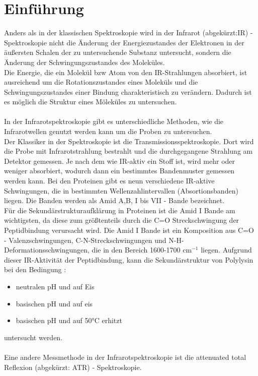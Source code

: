 \documentclass[10pt,a4paper]{article}
\begin{document}
	\section{Einführung}	
	Anders als in der klassischen Spektroskopie wird in der Infrarot (abgekürzt:IR) - Spektroskopie nicht die Änderung der Energiezustandes der Elektronen in der äußersten Schalen der zu untersuchende Substanz untersucht, sondern die Änderung der Schwingungszustandes des Moleküles.\\
	Die Energie, die ein Molekül bzw Atom von den IR-Strahlungen absorbiert, ist ausreichend um die Rotationszustandes eines Moleküls und die Schwingungszustandes einer Bindung charakteristisch zu verändern.
	Dadurch ist es möglich die Struktur eines Möleküles zu untersuchen.\\
	\\
	In der Infrarotspektroskopie gibt es unterschiedliche Methoden, wie die Infrarotwellen genutzt werden kann um die Proben zu untersuchen.\\
	Der Klassiker in der Spektroskopie ist die Transmissionsspektroskopie.
	Dort wird die Probe mit Infrarotstrahlung bestrahlt und die durchgegangene Strahlung am Detektor gemessen.
	Je nach dem wie IR-aktiv ein Stoff ist, wird mehr oder weniger absorbiert, wodurch dann ein bestimmtes Bandenmuster gemessen werden kann.
	Bei den Proteinen gibt es neun verschiedene IR-aktive Schwingungen, die in bestimmten Wellenzahlintervallen (Absortionsbanden) liegen. Die Banden werden als Amid A,B, I bis VII - Bande bezeichnet.\\
	Für die Sekundärstrukturaufklärung in Proteinen ist die Amid I Bande am wichtigsten, da diese zum größtenteils durch die C=O Streckschwingung der Peptidbindung verursacht wird. Die Amid I Bande ist ein Komposition aus C=O - Valenzschwingungen, C-N-Streckschwingungen und N-H-Deformationsschwingungen, die in den Bereich 1600-1700 cm$^{-1}$ liegen.
	Aufgrund dieser IR-Aktivität der Peptidbindung, kann die Sekundärstruktur von Polylysin bei den Bedingung :\\
	\begin{itemize}
		\item neutralen pH und auf Eis
		\item basischen pH und auf eis
		\item basischen pH und auf 50°C erhitzt
	\end{itemize}
	untersucht werden.\\
	\\
	Eine andere Messmethode in der Infrarotspektroskopie ist die attenuated total Reflexion (abgekürzt: ATR) - Spektroskopie.
\end{document}
